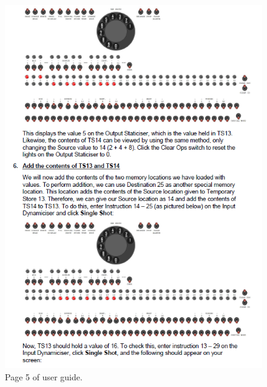 \documentclass{l4proj}
\begin{document}
\begin{appendices}
\begin{figure}
	\centering
	\includegraphics{images/ug-5}
	\caption{Page 5 of user guide.}
	\label{fig:pg-5}
\end{figure}


\end{appendices}
\end{document}
